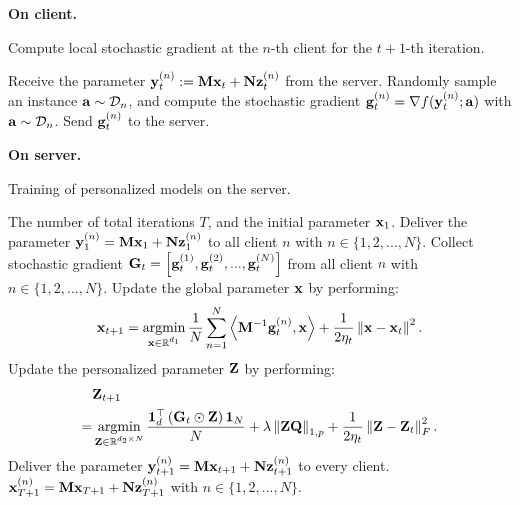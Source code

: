 \documentclass[journal]{IEEEtran}
\newcommand\algotext[1]{\end{algorithmic}#1\begin{algorithmic}[1]}
\begin{document}
\textbf{On client.}  

\begin{algorithm}[!]
    \caption{Compute local stochastic gradient at the $n$-th client for the $t+1$-th iteration.}
    \label{algo_xxx}
    \begin{algorithmic}[1]
        \State Receive the parameter ${\bf y}_t^{(n)} := {\bf M}{\bf x}_t + {\bf N}{\bf z}_t^{(n)}$ from the server.
        \State Randomly sample an instance ${\bf a}\sim\mathcal{D}_n$, and compute the stochastic gradient ${\bf g}^{(n)}_t = \nabla f({\bf y}_t^{(n)};{\bf a})$ with ${\bf a}\sim\mathcal{D}_n$.
        \State Send ${\bf g}^{(n)}_t$ to the server.
    \end{algorithmic}
\end{algorithm} 





\textbf{On server.}

\begin{algorithm}[!]
    \caption{Training of personalized models on the server.}
    \label{algo_xxx}
    \begin{algorithmic}[1]
        \Require The number of total iterations $T$, and the initial parameter ${\bf x}_1$.
        \State Deliver the parameter ${\bf y}_1^{(n)} = {\bf M}{\bf x}_1 + {\bf N}{\bf z}_1^{(n)}$ to all client $n$ with $n\in\{1,2, ..., N\}$.
            \State Collect stochastic gradient ${\bf G}_t = \left [ {\bf g}_t^{(1)}, {\bf g}_t^{(2)}, ..., {\bf g}_t^{(N)} \right ]$ from all client $n$ with $n\in\{1,2, ..., N\}$.
            \State Update the global parameter ${\bf x}$ by performing:
            $$ \x_{t+1} = \argmin_{\substack{\x\in\RR^{d_1}}} \frac{1}{N}\sum_{n=1}^N \lrangle{\M^{-1}\g_t^{(n)}, \x} + \frac{1}{2\eta_t}\lrnorm{\x - \x_t}^2.$$
            \State Update the personalized parameter ${\bf Z}$ by performing:
            \begin{align}
            \nonumber
            &\Z_{t+1} \\ \nonumber
            = & \argmin_{\substack{\Z\in\RR^{d_2\times N}}} \frac{\1_d^\top\lrincir{\G_t \odot \Z}\1_N}{N} + \lambda \lrnorm{\Z\Q}_{1,p} + \frac{1}{2\eta_t}\lrnorm{\Z - \Z_t}_F^2.
            \end{align}
            \State Deliver the parameter ${\bf y}_{t+1}^{(n)} = {\bf M}{\bf x}_{t+1} + {\bf N}{\bf z}_{t+1}^{(n)}$ to every client.
        \EndFor
        \Return ${\bf x}_{T+1}^{(n)} = {\bf M}{\bf x}_{T+1} + {\bf N}{\bf z}_{T+1}^{(n)}$ with $n\in\{1,2, ..., N\}$.
      \end{algorithmic}
\end{algorithm} 
\end{document}
